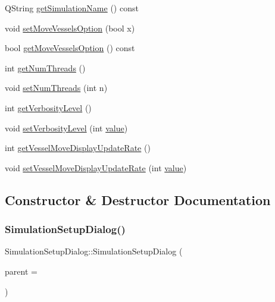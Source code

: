 \begin{DoxyCompactItemize}
Q\+String \mbox{\hyperlink{class_simulation_setup_dialog_ae66e58148255fae03204cc4946fa27ab}{get\+Simulation\+Name}} () const
\item 
void \mbox{\hyperlink{class_simulation_setup_dialog_a1c0d8a255b6f66f63c195207fcf080c9}{set\+Move\+Vessels\+Option}} (bool x)
\item 
bool \mbox{\hyperlink{class_simulation_setup_dialog_acf600fd17cea42d34c64ad00182ce358}{get\+Move\+Vessels\+Option}} () const
\item 
int \mbox{\hyperlink{class_simulation_setup_dialog_a7645ae9b927ad850319521ef336255a5}{get\+Num\+Threads}} ()
\item 
void \mbox{\hyperlink{class_simulation_setup_dialog_abd0869a1f998f3ecf226adc3621d0ebf}{set\+Num\+Threads}} (int n)
\item 
int \mbox{\hyperlink{class_simulation_setup_dialog_a89e83c85e2cea94233ee989395144110}{get\+Verbosity\+Level}} ()
\item 
void \mbox{\hyperlink{class_simulation_setup_dialog_a5781c5f92780939509a0a50717c8cc72}{set\+Verbosity\+Level}} (int \mbox{\hyperlink{diffusion_8cpp_a4b41795815d9f3d03abfc739e666d5da}{value}})
\item 
int \mbox{\hyperlink{class_simulation_setup_dialog_abd48937bab0b02d711126ee60f080fff}{get\+Vessel\+Move\+Display\+Update\+Rate}} ()
\item 
void \mbox{\hyperlink{class_simulation_setup_dialog_a6dafa75cf3ae80647804b90304aa31e9}{set\+Vessel\+Move\+Display\+Update\+Rate}} (int \mbox{\hyperlink{diffusion_8cpp_a4b41795815d9f3d03abfc739e666d5da}{value}})
\end{DoxyCompactItemize}


\subsection{Constructor \& Destructor Documentation}
\mbox{\label{class_simulation_setup_dialog_a335840ce4453718ba812eac74a2d4939}} 
\subsubsection{\texorpdfstring{SimulationSetupDialog()}{SimulationSetupDialog()}}
{\footnotesize\ttfamily Simulation\+Setup\+Dialog\+::\+Simulation\+Setup\+Dialog (\begin{DoxyParamCaption}\item[{Q\+Widget $\ast$}]{parent = {} }\end{DoxyParamCaption})\hspace{0.3cm}{\ttfamily [explicit]}}

